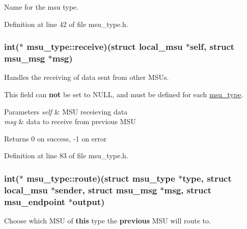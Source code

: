 Name for the msu type. 



Definition at line 42 of file msu\-\_\-type.\-h.

\hypertarget{structmsu__type_a8e80deeae69a39533061d4407fa7c53d}{
\subsubsection[{receive}]{\setlength{\rightskip}{0pt plus 5cm}int($\ast$ msu\-\_\-type\-::receive)(struct {\bf local\-\_\-msu} $\ast$self, struct {\bf msu\-\_\-msg} $\ast$msg)}}\label{structmsu__type_a8e80deeae69a39533061d4407fa7c53d}


Handles the receiving of data sent from other M\-S\-Us. 

This field can {\bfseries not} be set to N\-U\-L\-L, and must be defined for each \hyperlink{structmsu__type}{msu\-\_\-type}. 
\begin{DoxyParams}{Parameters}
{\em self} & M\-S\-U receieving data \\
\hline
{\em msg} & data to receive from previous M\-S\-U \\
\hline
\end{DoxyParams}
\begin{DoxyReturn}{Returns}
0 on success, -\/1 on error 
\end{DoxyReturn}


Definition at line 83 of file msu\-\_\-type.\-h.

\hypertarget{structmsu__type_ab076ecc00c1838c66351f51f9f2b684e}{
\subsubsection[{route}]{\setlength{\rightskip}{0pt plus 5cm}int($\ast$ msu\-\_\-type\-::route)(struct {\bf msu\-\_\-type} $\ast$type, struct {\bf local\-\_\-msu} $\ast$sender, struct {\bf msu\-\_\-msg} $\ast$msg, struct {\bf msu\-\_\-endpoint} $\ast$output)}}\label{structmsu__type_ab076ecc00c1838c66351f51f9f2b684e}


Choose which M\-S\-U of {\bfseries this} type the {\bfseries previous} M\-S\-U will route to. 

